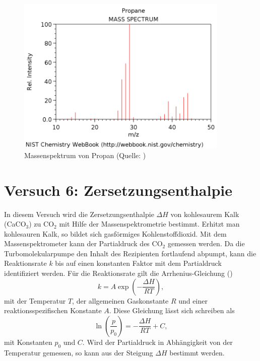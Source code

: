 \begin{figure}[tb]
	\centering\includegraphics[width=0.9\textwidth]{fig/propan.png}
	\caption{Massenspektrum von Propan (Quelle: \cite{Nist})}
	\label{fig:v54}
\end{figure}

\section{Versuch 6: Zersetzungsenthalpie}

In diesem Versuch wird die Zersetzungsenthalpie $\Delta H$ von kohlesaurem Kalk (CaCO$_{3}$) zu CO$_{2}$ mit Hilfe der Massenspektrometrie bestimmt.
Erhitzt man kohlesauren Kalk, so bildet sich gasförmiges Kohlenstoffdioxid. Mit dem Massenspektrometer kann der Partialdruck des CO$_{2}$ gemessen werden. Da die Turbomolekularpumpe den Inhalt des Rezipienten fortlaufend abpumpt, kann die Reaktionsrate $k$ bis auf einen konstanten Faktor mit dem Partialdruck identifiziert werden.
Für die Reaktionsrate gilt die Arrhenius-Gleichung (\cite{wiki})
\begin{equation}
 k = A \exp\left(-\frac{\Delta H}{RT} \right),
\end{equation}
mit der Temperatur $T$, der allgemeinen Gaskonstante $R$ und einer reaktionsspezifischen Konstante $A$. Diese Gleichung lässt sich schreiben als
\begin{equation}
 \ln\left(\frac{p}{p_{0}}\right) = -\frac{\Delta H}{RT} + C,
\end{equation}
mit Konstanten $p_{0}$ und $C$. Wird der Partialdruck in Abhängigkeit von der Temperatur gemessen, so kann aus der Steigung $\Delta H$ bestimmt werden.

